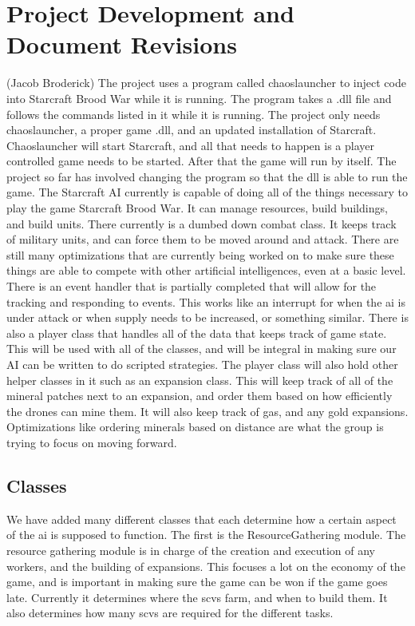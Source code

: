 \documentclass[10pt,letterpaper,onecolumn,draftclsnofoot]{IEEEtran}
\begin{document}
	\section{Project Development and Document Revisions} (Jacob Broderick)
	The project uses a program called chaoslauncher to inject code into Starcraft Brood War while it is running. The program takes a .dll file and follows the commands listed in it while it is running. The project only needs chaoslauncher, a proper game .dll, and an updated installation of Starcraft. Chaoslauncher will start Starcraft, and all that needs to happen is a player controlled game needs to be started. After that the game will run by itself. The project so far has involved changing the program so that the dll is able to run the game. The Starcraft AI currently is capable of doing all of the things necessary to play the game Starcraft Brood War. It can manage resources, build buildings, and build units. There currently is a dumbed down combat class. It keeps track of military units, and can force them to be moved around and attack. There are still many optimizations that are currently being worked on to make sure these things are able to compete with other artificial intelligences, even at a basic level. There is an event handler that is partially completed that will allow for the tracking and responding to events. This works like an interrupt for when the ai is under attack or when supply needs to be increased, or something similar. There is also a player class that handles all of the data that keeps track of game state. This will be used with all of the classes, and will be integral in making sure our AI can be written to do scripted strategies. The player class will also hold other helper classes in it such as an expansion class. This will keep track of all of the mineral patches next to an expansion, and order them based on how efficiently the drones can mine them. It will also keep track of gas, and any gold expansions. Optimizations like ordering minerals based on distance are what the group is trying to focus on moving forward. 
	
	\subsection{Classes}
	We have added many different classes that each determine how a certain aspect of the ai is supposed to function. The first is the ResourceGathering module. The resource gathering module is in charge of the creation and execution of any workers, and the building of expansions. This focuses a lot on the economy of the game, and is important in making sure the game can be won if the game goes late. Currently it determines where the scvs farm, and when to build them. It also determines how many scvs are required for the different tasks.  
	
\end{document}
